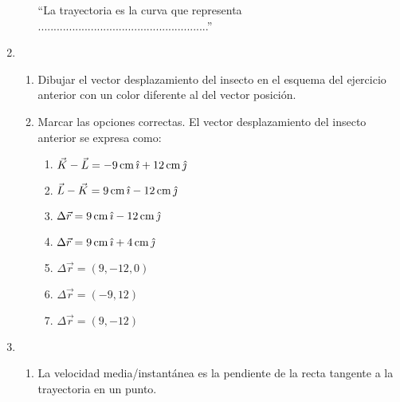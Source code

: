 \documentclass[a4paper,12pt,twoside]{book}
\begin{document}
\begin{mdframed}[style=ejercicio-conceptual]
\begin{enumerate}
\begin{enumerate}
            ``La trayectoria es la curva que representa .......................................................''
        \end{enumerate}

        \item {}

        \begin{enumerate}
            \item Dibujar el vector desplazamiento del insecto en el esquema del ejercicio anterior con un color diferente al del vector posición.

            \item Marcar las opciones correctas. El vector desplazamiento del insecto anterior se expresa como:

            \begin{enumerate}
                \item $\vec{K} - \vec{L} = - 9 \, \si{\centi\metre} \, \hat{\imath} + 12 \, \si{\centi\metre} \, \hat{\jmath}$

                \item $\vec{L} - \vec{K} = 9 \, \si{\centi\metre} \, \hat{\imath} - 12 \, \si{\centi\metre} \, \hat{\jmath}$

                \item $\Delta \vec{r} = 9 \, \si{\centi\metre} \, \hat{\imath} - 12 \, \si{\centi\metre} \, \hat{\jmath}$

                \item $\Delta \vec{r} = 9 \, \si{\centi\metre} \, \hat{\imath} + 4 \, \si{\centi\metre} \, \hat{\jmath}$

                \item $\Delta \vec{r} = (9,-12,0)$

                \item $\Delta \vec{r} = (-9,12)$

                \item $\Delta\vec{r} = (9,-12)$
            \end{enumerate}
        \end{enumerate}
            
        \item {}

        \begin{enumerate}
            \item La velocidad media/instantánea es la pendiente de la recta tangente a la trayectoria en un punto.


\end{enumerate}
\end{enumerate}
\end{mdframed}
\end{document}
